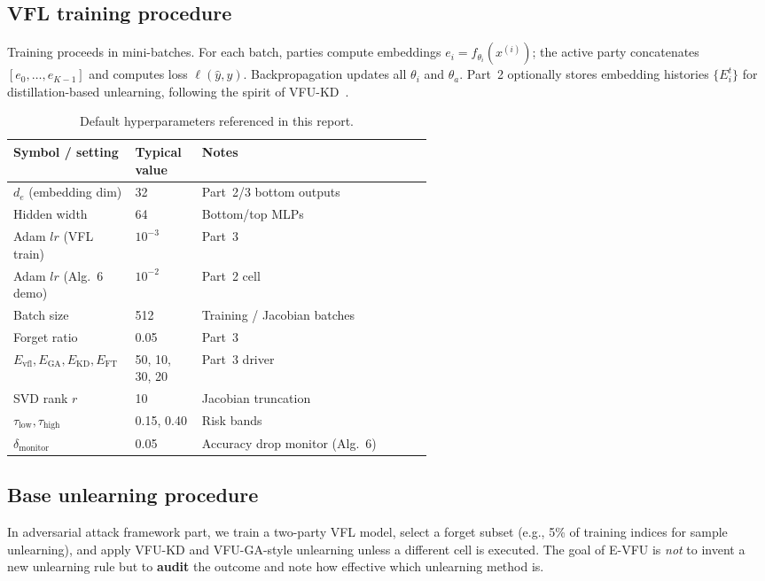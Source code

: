 \documentclass[sigconf,nonacm]{acmart}
\begin{document}
\subsection{VFL training procedure}
Training proceeds in mini-batches. For each batch, parties compute embeddings $e_i = f_{\theta_i}(x^{(i)})$; the active party concatenates $[e_0,\ldots,e_{K-1}]$ and computes loss $\ell(\hat{y}, y)$. Backpropagation updates all $\theta_i$ and $\theta_a$. Part~2 optionally stores embedding histories $\{E_i^t\}$ for distillation-based unlearning, following the spirit of VFU-KD~\cite{varshney2025vfu}.


\begin{table}[t]
  \caption{Default hyperparameters referenced in this report.}
  \label{tab:hyper}
  \centering
  \small
  \begin{tabular}{@{}llp{0.55\linewidth}@{}}
    \toprule
    Symbol / setting & Typical value & Notes \\
    \midrule
    $d_e$ (embedding dim) & 32 & Part~2/3 bottom outputs \\
    Hidden width & 64 & Bottom/top MLPs \\
    Adam $lr$ (VFL train) & $10^{-3}$ & Part~3 \\
    Adam $lr$ (Alg.~6 demo) & $10^{-2}$ & Part~2 cell \\
    Batch size & 512 & Training / Jacobian batches \\
    Forget ratio & 0.05 & Part~3 \\
    $E_{\mathrm{vfl}},E_{\mathrm{GA}},E_{\mathrm{KD}},E_{\mathrm{FT}}$ & 50, 10, 30, 20 & Part~3 driver \\
    SVD rank $r$ & 10 & Jacobian truncation \\
    $\tau_{\mathrm{low}},\tau_{\mathrm{high}}$ & 0.15, 0.40 & Risk bands \\
    $\delta_{\mathrm{monitor}}$ & 0.05 & Accuracy drop monitor (Alg.~6) \\
    \bottomrule
  \end{tabular}
\end{table}

\subsection{Base unlearning procedure}
In adversarial attack framework part, we train a two-party VFL model, select a forget subset (e.g., 5\% of training indices for sample unlearning), and apply VFU-KD and VFU-GA-style unlearning unless a different cell is executed. The goal of E-VFU is \emph{not} to invent a new unlearning rule but to \textbf{audit} the outcome and note how effective which unlearning method is.
\end{document}
